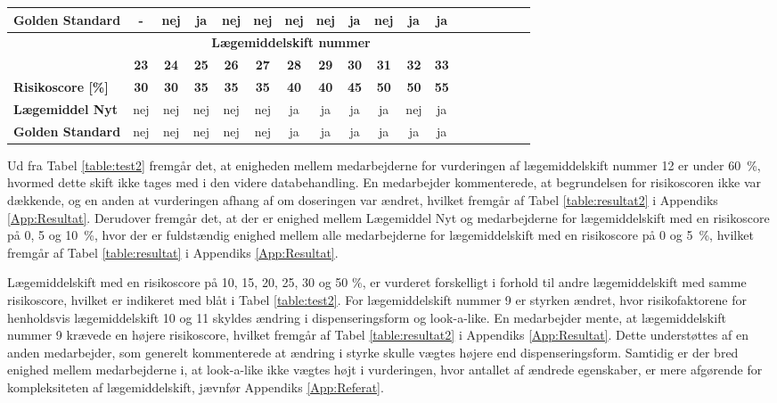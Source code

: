 \begin{longtable}{|l|c|c|c|c|c|c|c|c|c|c|c|c|c|c|c|c|c|}
\cellcolor[HTML]{C0C0C0}\textbf{Golden Standard} & \cellcolor[HTML]{FD6864} - & nej & \cellcolor[HTML]{32CB00}ja & nej & nej & nej & \cellcolor[HTML]{32CB00}nej & \cellcolor[HTML]{32CB00} ja & \cellcolor[HTML]{32CB00}nej & \cellcolor[HTML]{32CB00}ja & ja \\ \hline
\rowcolor[HTML]{C0C0C0} & \multicolumn{11}{|c|}{\textbf{Lægemiddelskift nummer}} \\ 
\rowcolor[HTML]{C0C0C0} & \textbf{23} & \textbf{24} & \textbf{25} & \textbf{26} & \textbf{27} & \textbf{28} &  \textbf{29} & \textbf{30} & \textbf{31} & \textbf{32} & \textbf{33}  \\ \hline
\cellcolor[HTML]{C0C0C0}\textbf{Risikoscore [\%]} & \textbf{30} & \textbf{30} & \textbf{35} & \textbf{35} & \textbf{35} & \textbf{40} & \textbf{40} & \textbf{45} & \textbf{50} & \cellcolor[HTML]{34CDF9}\textbf{50} & \textbf{55} \\ \hline 
\cellcolor[HTML]{C0C0C0}\textbf{Lægemiddel Nyt} & nej & nej & nej & nej & nej & ja & ja & ja & ja & \cellcolor[HTML]{32CB00} nej & ja\\ \hline
\cellcolor[HTML]{C0C0C0}\textbf{Golden Standard} & nej & nej & nej & nej & nej & ja & ja& ja & ja&\cellcolor[HTML]{32CB00}ja & ja \\\hline
\end{longtable}
\vspace{0.5cm}

Ud fra Tabel \ref{table:test2} fremgår det, at enigheden mellem medarbejderne for vurderingen af lægemiddelskift nummer 12 er under 60~\%, hvormed dette skift ikke tages med i den videre databehandling. En medarbejder kommenterede, at begrundelsen for risikoscoren ikke var dækkende, og en anden at vurderingen  afhang af om doseringen var ændret, hvilket fremgår af Tabel \ref{table:resultat2} i Appendiks \ref{App:Resultat}. %
Derudover fremgår det, at der er enighed mellem Lægemiddel Nyt og medarbejderne for lægemiddelskift med en risikoscore på 0, 5 og 10~\%, hvor der er  fuldstændig enighed mellem alle medarbejderne for lægemiddelskift med en risikoscore på 0 og 5~\%, hvilket fremgår af Tabel \ref{table:resultat} i Appendiks \ref{App:Resultat}.

Lægemiddelskift med en risikoscore på 10, 15, 20, 25, 30 og 50 \%, er vurderet forskelligt i forhold til andre lægemiddelskift med samme risikoscore, hvilket er indikeret med blåt i Tabel \ref{table:test2}. For lægemiddelskift nummer 9 er styrken ændret, hvor risikofaktorene for henholdsvis lægemiddelskift 10 og 11 skyldes ændring i dispenseringsform og look-a-like. En medarbejder mente, at lægemiddelskift nummer 9 krævede en højere risikoscore, hvilket fremgår af Tabel \ref{table:resultat2} i Appendiks \ref{App:Resultat}. Dette understøttes af en anden medarbejder, som generelt kommenterede at ændring i styrke skulle vægtes højere end dispenseringsform. Samtidig er der bred enighed mellem medarbejderne i, at look-a-like ikke vægtes højt i vurderingen, hvor antallet af ændrede egenskaber,  er mere afgørende for kompleksiteten af lægemiddelskift, jævnfør Appendiks \ref{App:Referat}. 

